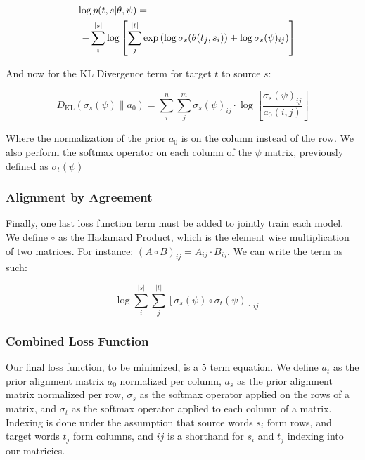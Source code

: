 \documentclass[twoside,twocolumn]{article}
\begin{document}
\begin{equation}
  \centering
  \begin{split}
  -\log  p(t & , s | \theta, \psi) = \\
  - \sum_i^{|s|} & \log \left[ \sum_j^{|t|} \exp \left( \log \sigma_s(\theta(t_j, s_i)) + \log \sigma_s(\psi)_{ij} \right) \right]
\end{split}
\end{equation}

And now for the KL Divergence term for target $t$ to source $s$:

\begin{equation}
  D_{\mathrm{KL}} (  \sigma_s(\psi) \| a_0) = \sum_i^n \sum_j^m \sigma_s(\psi)_{ij}  \cdot \log \left[ \frac{\sigma_s(\psi)_{ij}}{a_0(i, j)} \right]
\end{equation}

Where the normalization of the prior $a_0$ is on the column instead of the row. We also perform the softmax operator on each column of the $\psi$ matrix, previously defined as $\sigma_t(\psi)$

\subsubsection{Alignment by Agreement}
Finally, one last loss function term must be added to jointly train each model. We define $\circ$ as the Hadamard Product, which is the element wise multiplication of two matrices. For instance: $(A \circ B)_{ij} = A_{ij} \cdot B_{ij}$. We can write the term as such:

\begin{equation}
  -\log \sum_i^{|s|} \sum_j^{|t|} \left[ \sigma_s(\psi) \circ \sigma_t(\psi) \right]_{ij}
\end{equation}


\subsubsection{Combined Loss Function}
Our final loss function, to be minimized, is a 5 term equation. We define $a_t$ as the prior alignment matrix $a_0$ normalized per column, $a_s$ as the prior alignment matrix normalized per row, $\sigma_s$ as the softmax operator applied on the rows of a matrix, and $\sigma_t$ as the softmax operator applied to each column of a matrix. Indexing is done under the assumption that source words $s_i$ form rows, and target words $t_j$ form columns, and $ij$ is a shorthand for $s_i$ and $t_j$ indexing into our matricies.
\end{document}
